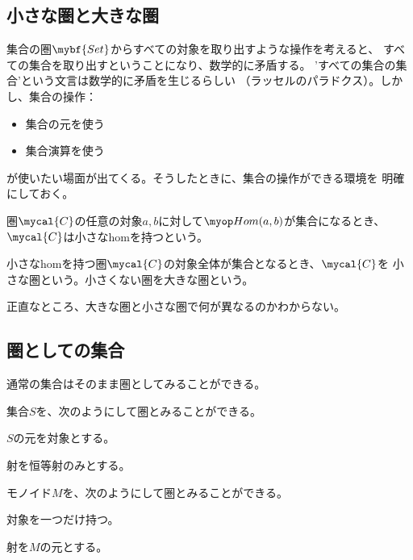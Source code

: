 \subsection{小さな圏と大きな圏}\label{s2:小さな圏と大きな圏} %
	集合の圏$\mybf{Set}$からすべての対象を取り出すような操作を考えると、
	すべての集合を取り出すということになり、数学的に矛盾する。
	'すべての集合の集合'という文言は数学的に矛盾を生じるらしい
	（ラッセルのパラドクス）。しかし、集合の操作：
	\begin{itemize}\setlength{\itemsep}{-1mm} %
		\item 集合の元を使う
		\item 集合演算を使う
	\end{itemize} %
	が使いたい場面が出てくる。そうしたときに、集合の操作ができる環境を
	明確にしておく。

	\begin{definition}[小さなhom]\label{def:小さなhom} %
		圏$\mycal{C}$の任意の対象$a,b$に対して$\Hom(a,b)$が集合になるとき、
		$\mycal{C}$は小さなhomを持つという。
	\end{definition} %

	\begin{definition}[小さな圏]\label{def:小さな圏} %
		小さなhomを持つ圏$\mycal{C}$の対象全体が集合となるとき、$\mycal{C}$を
		小さな圏という。小さくない圏を大きな圏という。
	\end{definition} %

	正直なところ、大きな圏と小さな圏で何が異なるのかわからない。
\subsection{圏としての集合}\label{s2:圏としての集合} %
	通常の集合はそのまま圏としてみることができる。

	\begin{description}\setlength{\itemsep}{-1mm} %
		\item[集合] 集合$S$を、次のようにして圏とみることができる。
		\begin{description}\setlength{\itemsep}{-1mm} %
			\item[対象] $S$の元を対象とする。
			\item[射] 射を恒等射のみとする。
		\end{description} %
		\item[モノイド] モノイド$M$を、次のようにして圏とみることができる。
		\begin{description}\setlength{\itemsep}{-1mm} %
			\item[対象] 対象を一つだけ持つ。
			\item[射] 射を$M$の元とする。
		\end{description} %
	\end{description} %
